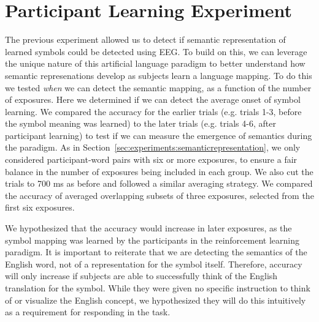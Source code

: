 \section{Participant Learning Experiment}
\label{sec:experiments:participantlearning}
The previous experiment allowed us to detect if semantic representation of 
learned symbols could be detected using EEG. To build on this, we can leverage 
the unique nature of this artificial language paradigm to better understand how 
semantic represenations develop as subjects learn a language mapping. To do 
this we tested \emph{when} we can detect the semantic mapping, as a function of 
the number of exposures.  Here we determined if we can detect the average onset 
of symbol learning. We compared the \tvt accuracy for the earlier trials (e.g.  
trials 1-3, before the symbol meaning was learned) to the later trials (e.g.  
trials 4-6, after participant learning) to test if we can measure the emergence 
of semantics during the paradigm. As in 
Section~\ref{sec:experiments:semanticrepresentation}, we only considered 
participant-word pairs with six or more exposures, to ensure a fair balance in 
the number of exposures being included in each group. We also cut the trials to 
700 ms as before and followed a similar averaging strategy. We compared the 
\tvt accuracy of averaged overlapping subsets of three exposures, selected from 
the first six exposures.

We hypothesized that the \tvt accuracy would increase in later exposures, as 
the symbol mapping was learned by the participants in the reinforcement 
learning paradigm. It is important to reiterate that we are detecting the 
semantics of the English word, not of a representation for the symbol itself.  
Therefore, accuracy will only increase if subjects are able to successfully 
think of the English translation for the symbol. While they were given no 
specific instruction to think of or visualize the English concept, we 
hypothesized they will do this intuitively as a requirement for responding in 
the task.
